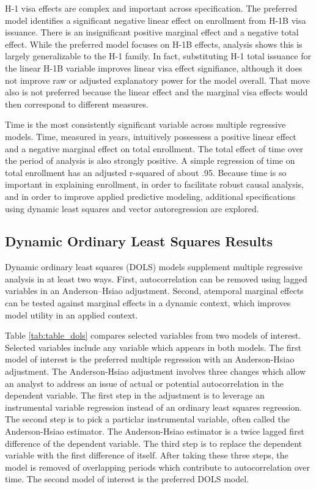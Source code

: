 \documentclass[review]{elsarticle}
\begin{document}
H-1 visa effects are complex and important across specification.
The preferred model identifies a significant negative linear effect on enrollment
from H-1B visa issuance.
There is an insignificant positive marginal effect and a negative total effect.
While the preferred model focuses on H-1B effects, analysis shows this is largely
generalizable to the H-1 family.
In fact, substituting H-1 total issuance for the linear H-1B variable improves
linear visa effect signifiance,
although it does not improve raw or adjusted explanatory power for the model overall.
That move also is not preferred because the linear effect and the marginal visa effects would then correspond to different measures.

Time is the most consistently significant variable across multiple regressive models.
Time, measured in years, intuitively possessess a positive linear effect and a negative marginal effect on total enrollment.
The total effect of time over the period of analysis is also strongly positive.
A simple regression of time on total enrollment has an adjusted r-squared of about .95.
Because time is so important in explaining enrollment,
in order to facilitate robust causal analysis,
and in order to improve applied predictive modeling,
additional specifications using dynamic least squares and vector autoregression
are explored.

\subsection{Dynamic Ordinary Least Squares Results}

Dynamic ordinary least squares (DOLS) models supplement multiple regressive analysis in at least two ways.
First, autocorrelation can be removed using lagged variables in an Anderson–Hsiao adjustment\cite{anderson1981estimation}.
Second, atemporal marginal effects can be tested against marginal effects in a dynamic context,
which improves model utility in an applied context.

Table \ref{tab:table_dols} compares selected variables from two models of interest.
Selected variables include any variable which appears in both models.
The first model of interest is the preferred multiple regression with an Anderson-Hsiao adjustment.
The Anderson-Hsiao adjustment involves three changes which allow an analyst to address an issue of actual or potential autocorrelation in the dependent variable.
The first step in the adjustment is to leverage an instrumental variable regression instead of an ordinary least squares regression.
The second step is to pick a particlar instrumental variable, often called the Anderson-Hsiao estimator.
The Anderson-Hsiao estimator is a twice lagged first difference of the dependent variable.
The third step is to replace the dependent variable with the first difference of itself.
After taking these three steps, the model is removed of overlapping periods which contribute to autocorrelation over time.
The second model of interest is the preferred DOLS model.
\end{document}
